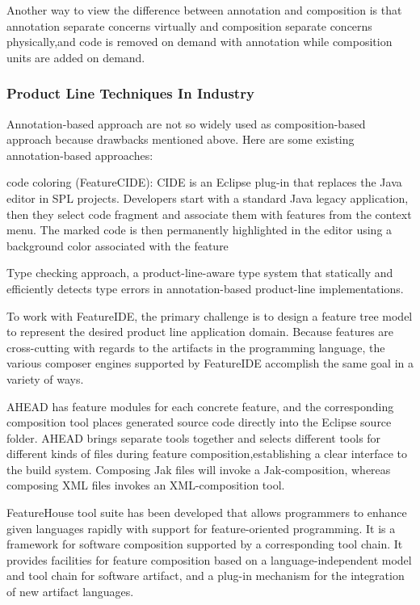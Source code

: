 \documentclass[sigconf]{acmart}
\begin{document}
Another way to view the difference between annotation and composition is that annotation separate concerns
virtually and composition separate concerns physically,and code is removed on demand with annotation while
composition units are added on demand.


\subsubsection{Product Line Techniques In Industry}

Annotation-based approach are not so widely used as composition-based approach because drawbacks mentioned above.
Here are some existing annotation-based approaches:

code coloring (FeatureCIDE): CIDE is an Eclipse plug-in that replaces the Java editor in SPL projects. Developers
start with a standard Java legacy application, then they select code fragment and associate them with features
 from the context menu. The marked code is then permanently highlighted in the editor using a background color
 associated with the feature

Type checking approach,  a product-line-aware type system that statically and efficiently detects type errors in
annotation-based product-line implementations.


To work with FeatureIDE, the primary challenge is to design a feature tree model to represent the desired product
line application domain. Because features are cross-cutting with regards to the artifacts in the programming
language, the various composer engines supported by FeatureIDE accomplish the same goal in a variety of ways.

AHEAD has feature modules for each concrete feature, and the corresponding composition tool places generated
source code directly into the Eclipse source folder. AHEAD brings separate tools together and selects different
tools for different kinds of files during feature composition,establishing a clear interface to the build
system. Composing Jak files will invoke a Jak-composition, whereas composing XML files invokes an
XML-composition tool.

FeatureHouse tool suite has been developed that allows programmers to enhance given languages rapidly with
support for feature-oriented programming. It is a framework for software composition supported by a
corresponding tool chain. It provides facilities for feature  composition based on a language-independent
model and tool chain for software artifact, and a plug-in mechanism for the integration of new artifact
languages.
\end{document}
